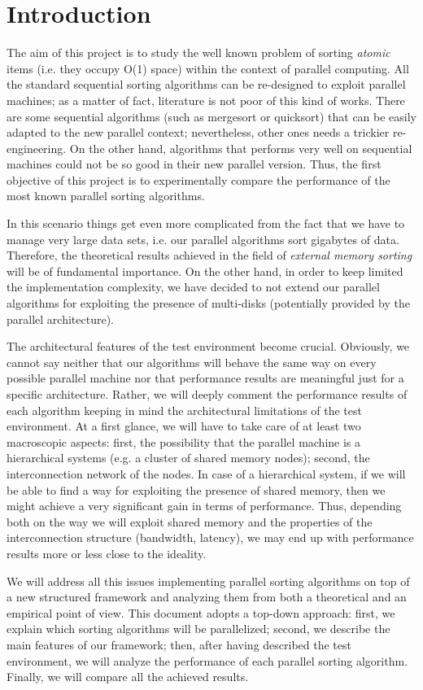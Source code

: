 \section{Introduction}
The aim of this project is to study the well known problem of sorting \textit{atomic} items (i.e. they occupy O(1) space) within the context of parallel computing. All the standard sequential sorting algorithms can be re-designed to exploit parallel machines; as a matter of fact, literature is not poor of this kind of works. There are some sequential algorithms (such as mergesort or quicksort) that can be easily adapted to the new parallel context; nevertheless, other ones needs a trickier re-engineering. On the other hand, algorithms that performs very well on sequential machines could not be so good in their new parallel version. Thus, the first objective of this project is to experimentally compare the performance of the most known parallel sorting algorithms. 

In this scenario things get even more complicated from the fact that we have to manage very large data sets, i.e. our parallel algorithms sort gigabytes of data. Therefore, the theoretical results achieved in the field of \textit{external memory sorting} will be of fundamental importance. On the other hand, in order to keep limited the implementation complexity, we have decided to not extend our parallel algorithms for exploiting the presence of multi-disks (potentially provided by the parallel architecture). 

The architectural features of the test environment become crucial. Obviously, we cannot say neither that our algorithms will behave the same way on every possible parallel machine nor that performance results are meaningful just for a specific architecture. Rather, we will deeply comment the performance results of each algorithm keeping in mind the architectural limitations of the test environment. At a first glance, we will have to take care of at least two macroscopic aspects: first, the possibility that the parallel machine is a hierarchical systems (e.g. a cluster of shared memory nodes); second, the interconnection network of the nodes. In case of a hierarchical system, if we will be able to find a way for exploiting the presence of shared memory, then we might achieve a very significant gain in terms of performance. Thus, depending both on the way we will exploit shared memory and the properties of the interconnection structure (bandwidth, latency), we may end up with performance results more or less close to the ideality.

We will address all this issues implementing parallel sorting algorithms on top of a new structured framework and analyzing them from both a theoretical and an empirical point of view. This document adopts a top-down approach: first, we explain which sorting algorithms will be parallelized; second, we describe the main features of our framework; then, after having described the test environment, we will analyze the performance of each parallel sorting algorithm. Finally, we will compare all the achieved results.
